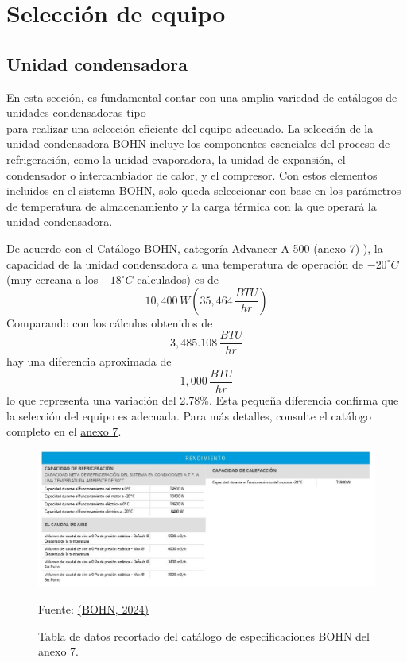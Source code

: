  \section{Selección de equipo}	

 
 \subsection{Unidad condensadora}
 
 En esta sección, es fundamental contar con una amplia variedad de catálogos de unidades condensadoras tipo \\
  para realizar una selección eficiente del equipo adecuado. La selección de la unidad condensadora BOHN incluye los componentes esenciales del proceso de refrigeración, como la unidad evaporadora, la unidad de expansión, el condensador o intercambiador de calor, y el compresor. Con estos elementos incluidos en el sistema BOHN, solo queda seleccionar con base en los parámetros de temperatura de almacenamiento y la carga térmica con la que operará la unidad condensadora.
 
 De acuerdo con el Catálogo BOHN, categoría Advancer A-500 (\hyperref[fig:axo-manual-thermo-king]{anexo 7}) ), la capacidad de la unidad condensadora a una temperatura de operación de $-20^\circ C$ (muy cercana a los $-18^\circ C$ calculados) es de 
 \[
 10,400\, W \left( 35,464\, \frac{BTU}{hr} \right)
 \]
 Comparando con los cálculos obtenidos de 
 \[
	3,485.108 \, \frac{BTU}{hr}
 \]
 hay una diferencia aproximada de 
 \[
 1,000\, \frac{BTU}{hr}
 \]
 lo que representa una variación del 2.78\%. Esta pequeña diferencia confirma que la selección del equipo es adecuada. Para más detalles, consulte el catálogo completo en el \hyperref[fig:axo-manual-thermo-king]{anexo 7}.
 
 \begin{figure}[H]
 	\centering
 	\includegraphics[width=0.8\linewidth]{figures/4-seleccion-condensador}
 	\caption{Tabla de datos recortado del catálogo de especificaciones BOHN del anexo 7.}
 	Fuente: \hyperref[fig:axo-manual-thermo-king]{(BOHN, 2024)}
 	\label{fig:4-seleccion-condensador}
 \end{figure}
 
